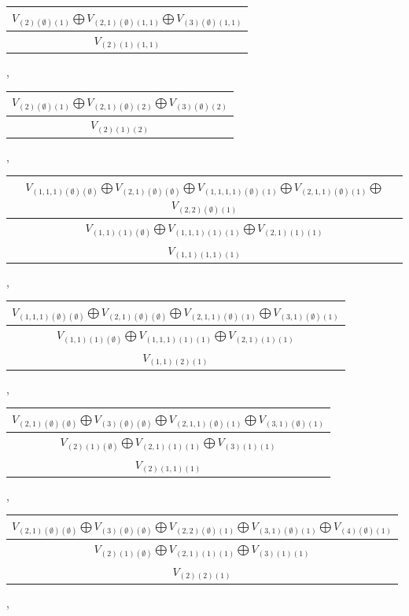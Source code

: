 \documentclass[letterpaper,11pt]{article}
\begin{document}
	\newline 
	\begin{tabular}{| c |}
		\hline
		$V_{(2)(\emptyset)(1)}$$\bigoplus$$V_{(2,1)(\emptyset)(1,1)}$$\bigoplus$$V_{(3)(\emptyset)(1,1)}$\\
		\hline
		$V_{(2)(1)(1,1)}$\\
		\hline
	\end{tabular}, 
	\begin{tabular}{| c |}
		\hline
		$V_{(2)(\emptyset)(1)}$$\bigoplus$$V_{(2,1)(\emptyset)(2)}$$\bigoplus$$V_{(3)(\emptyset)(2)}$\\
		\hline
		$V_{(2)(1)(2)}$\\
		\hline
	\end{tabular}, 
	\newline 
	\begin{tabular}{| c |}
		\hline
		$V_{(1,1,1)(\emptyset)(\emptyset)}$$\bigoplus$$V_{(2,1)(\emptyset)(\emptyset)}$$\bigoplus$$V_{(1,1,1,1)(\emptyset)(1)}$$\bigoplus$$V_{(2,1,1)(\emptyset)(1)}$$\bigoplus$$V_{(2,2)(\emptyset)(1)}$\\
		\hline
		$V_{(1,1)(1)(\emptyset)}$$\bigoplus$$V_{(1,1,1)(1)(1)}$$\bigoplus$$V_{(2,1)(1)(1)}$\\
		\hline
		$V_{(1,1)(1,1)(1)}$\\
		\hline
	\end{tabular}, 
	\newline 
	\begin{tabular}{| c |}
		\hline
		$V_{(1,1,1)(\emptyset)(\emptyset)}$$\bigoplus$$V_{(2,1)(\emptyset)(\emptyset)}$$\bigoplus$$V_{(2,1,1)(\emptyset)(1)}$$\bigoplus$$V_{(3,1)(\emptyset)(1)}$\\
		\hline
		$V_{(1,1)(1)(\emptyset)}$$\bigoplus$$V_{(1,1,1)(1)(1)}$$\bigoplus$$V_{(2,1)(1)(1)}$\\
		\hline
		$V_{(1,1)(2)(1)}$\\
		\hline
	\end{tabular}, 
	\begin{tabular}{| c |}
		\hline
		$V_{(2,1)(\emptyset)(\emptyset)}$$\bigoplus$$V_{(3)(\emptyset)(\emptyset)}$$\bigoplus$$V_{(2,1,1)(\emptyset)(1)}$$\bigoplus$$V_{(3,1)(\emptyset)(1)}$\\
		\hline
		$V_{(2)(1)(\emptyset)}$$\bigoplus$$V_{(2,1)(1)(1)}$$\bigoplus$$V_{(3)(1)(1)}$\\
		\hline
		$V_{(2)(1,1)(1)}$\\
		\hline
	\end{tabular}, 
	\newline 
	\begin{tabular}{| c |}
		\hline
		$V_{(2,1)(\emptyset)(\emptyset)}$$\bigoplus$$V_{(3)(\emptyset)(\emptyset)}$$\bigoplus$$V_{(2,2)(\emptyset)(1)}$$\bigoplus$$V_{(3,1)(\emptyset)(1)}$$\bigoplus$$V_{(4)(\emptyset)(1)}$\\
		\hline
		$V_{(2)(1)(\emptyset)}$$\bigoplus$$V_{(2,1)(1)(1)}$$\bigoplus$$V_{(3)(1)(1)}$\\
		\hline
		$V_{(2)(2)(1)}$\\
		\hline
	\end{tabular}, 
\end{document}
